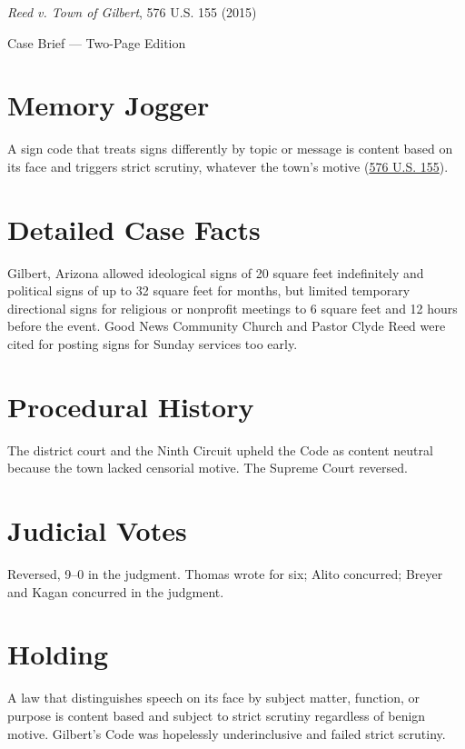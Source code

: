 \documentclass[12pt]{article}
\begin{document}
\begin{center}
{\LARGE \textit{Reed v. Town of Gilbert}, 576 U.S. 155 (2015)\par}
\vspace{0.5em}
{\large Case Brief --- Two-Page Edition\par}
\end{center}

\section{Memory Jogger}
A sign code that treats signs differently by topic or message is content based on its face and triggers strict scrutiny, whatever the town's motive (\href{https://supreme.justia.com/cases/federal/us/576/155/}{576 U.S. 155}).

\section{Detailed Case Facts}
Gilbert, Arizona allowed ideological signs of 20 square feet indefinitely and political signs of up to 32 square feet for months, but limited temporary directional signs for religious or nonprofit meetings to 6 square feet and 12 hours before the event. Good News Community Church and Pastor Clyde Reed were cited for posting signs for Sunday services too early.

\section{Procedural History}
The district court and the Ninth Circuit upheld the Code as content neutral because the town lacked censorial motive. The Supreme Court reversed.

\section{Judicial Votes}
Reversed, 9--0 in the judgment. Thomas wrote for six; Alito concurred; Breyer and Kagan concurred in the judgment.

\section{Holding}
A law that distinguishes speech on its face by subject matter, function, or purpose is content based and subject to strict scrutiny regardless of benign motive. Gilbert's Code was hopelessly underinclusive and failed strict scrutiny.
\end{document}
